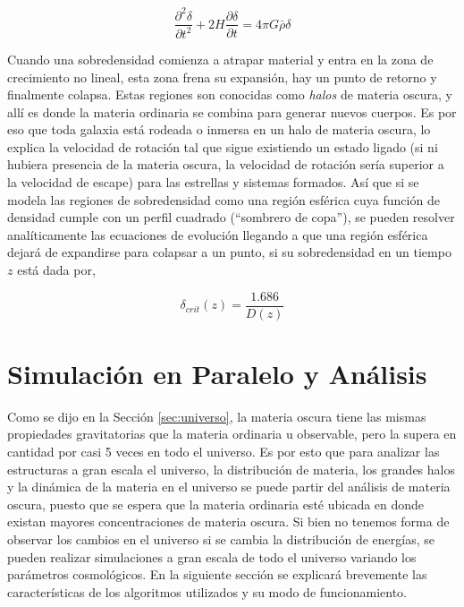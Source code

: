 \begin{equation}
\frac{\partial^{2}\delta}{\partial t^{2}}+2H\frac{\partial\delta}{\partial t}=4\pi G\bar{\rho}\delta
\label{eq:diff}
\end{equation}

Cuando una sobredensidad comienza a atrapar material y entra en la zona de crecimiento no lineal, esta zona frena su expansión, hay un punto de retorno y finalmente colapsa. Estas regiones son conocidas como \textit{halos} de materia oscura, y allí es donde la materia ordinaria se combina para generar nuevos cuerpos. Es por eso que toda galaxia está rodeada o inmersa en un halo de materia oscura, lo explica la velocidad de rotación tal que sigue existiendo un estado ligado (si ni hubiera presencia de la materia oscura, la velocidad de rotación sería superior a la velocidad de escape) para las estrellas y sistemas formados. Así que si se modela las regiones de sobredensidad como una región esférica cuya función de densidad cumple con un perfil cuadrado (``sombrero de copa''), se pueden resolver analíticamente las ecuaciones de evolución llegando a que una región esférica dejará de expandirse para colapsar a un punto, si su sobredensidad en un tiempo $z$ está dada por,

\begin{equation}
\delta_{crit}(z)=\frac{1.686}{D(z)}
\label{eq:critdens}
\end{equation}


\section{Simulación en Paralelo y Análisis}
Como se dijo en la Sección \ref{sec:universo}, la materia oscura tiene las mismas propiedades gravitatorias que la materia ordinaria u observable, pero la supera en cantidad por casi 5 veces en todo el universo. Es por esto que para analizar las estructuras a gran escala el universo, la distribución de materia, los grandes halos y la dinámica de la materia en el universo se puede partir del análisis de materia oscura, puesto que se espera que la materia ordinaria esté ubicada en donde existan mayores concentraciones de materia oscura. Si bien no tenemos forma de observar los cambios en el universo si se cambia la distribución de energías, se pueden realizar simulaciones a gran escala de todo el universo variando los parámetros cosmológicos. En la siguiente sección se explicará brevemente las características de los algoritmos utilizados y su modo de funcionamiento.


